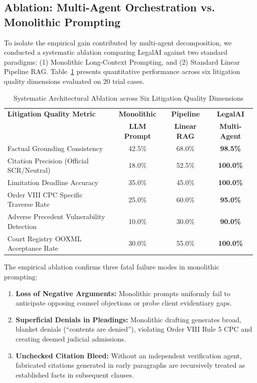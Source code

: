 \documentclass[conference]{IEEEtran}
\begin{document}
\subsection{Ablation: Multi-Agent Orchestration vs. Monolithic Prompting}
To isolate the empirical gain contributed by multi-agent decomposition, we conducted a systematic ablation comparing LegalAI against two standard paradigms: (1) Monolithic Long-Context Prompting, and (2) Standard Linear Pipeline RAG. Table~\ref{tab:ablation} presents quantitative performance across six litigation quality dimensions evaluated on 20 trial cases.

\begin{table}[t]
\caption{Systematic Architectural Ablation across Six Litigation Quality Dimensions}
\label{tab:ablation}
\centering
\scriptsize
\setlength{\tabcolsep}{3.2pt}
\begin{tabular}{lccc}
\toprule
\textbf{Litigation Quality Metric} & \textbf{Monolithic} & \textbf{Pipeline} & \textbf{LegalAI} \\
 & \textbf{LLM Prompt} & \textbf{Linear RAG} & \textbf{Multi-Agent} \\
\midrule
Factual Grounding Consistency & 42.5\% & 68.0\% & \textbf{98.5\%} \\
Citation Precision (Official SCR/Neutral) & 18.0\% & 52.5\% & \textbf{100.0\%} \\
Limitation Deadline Accuracy & 35.0\% & 45.0\% & \textbf{100.0\%} \\
Order VIII CPC Specific Traverse Rate & 25.0\% & 60.0\% & \textbf{95.0\%} \\
Adverse Precedent Vulnerability Detection & 10.0\% & 30.0\% & \textbf{90.0\%} \\
Court Registry OOXML Acceptance Rate & 30.0\% & 55.0\% & \textbf{100.0\%} \\
\bottomrule
\end{tabular}
\end{table}

The empirical ablation confirms three fatal failure modes in monolithic prompting:
\begin{enumerate}
    \item \textbf{Loss of Negative Arguments:} Monolithic prompts uniformly fail to anticipate opposing counsel objections or probe client evidentiary gaps.
    \item \textbf{Superficial Denials in Pleadings:} Monolithic drafting generates broad, blanket denials (``contents are denied''), violating Order VIII Rule 5 CPC and creating deemed judicial admissions.
    \item \textbf{Unchecked Citation Bleed:} Without an independent verification agent, fabricated citations generated in early paragraphs are recursively treated as established facts in subsequent clauses.
\end{enumerate}
\end{document}

